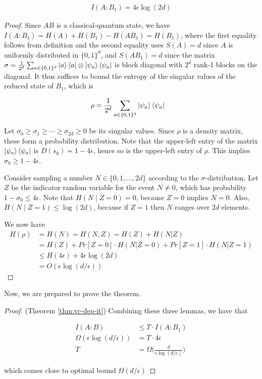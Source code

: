 \documentclass[main.tex]{subfiles}
\begin{document}
\begin{lemma}
\begin{align*}
I(A:B_1) = 4 \epsilon \log(2d)
\end{align*}

\begin{proof}
Since $AB$ is a classical-quantum state, we have $I(A : B_1) = H(A) + H(B_1) − H(AB_1) = H(B_1)$,
where the first equality follows from definition and the second equality uses $S(A) = d$ since
$A$ is uniformly distributed in $\{0,1\}^d$, and $S(AB_1) = d$ since the matrix $\sigma = \frac{1}{2^d} \sum_{a \in \{0,1\}^d} \ket{a}\bra{a} \otimes \ket{\psi_a} \bra{\psi_a}$ is block diagonal with $2^d$ rank-1 blocks on the diagonal. It thus suffices to bound the entropy of the singular values of the reduced state of $B_1$, which is

\begin{align*}
\rho &= \frac{1}{2^d} \sum_{a \in \{0, 1\}^d} \ket{\psi_a} \bra{\psi_a}	
\end{align*}

Let $\sigma_0 \geq \sigma_1 \geq \cdots \geq \sigma_{2d} \geq 0$ be its singular values. Since $\rho$ is a density matrix, these form a probability distribution. Note that the upper-left entry of the matrix $\ket{\psi_a}\bra{\psi_a}$ is $D(s_0) = 1-4\epsilon$, hence so is the upper-left entry of $\rho$. This implies $\sigma_0 \geq 1 − 4\epsilon$. 

Consider sampling a number $N \in \{0,1,...,2d\}$ according to the $\sigma$-distribution. Let $Z$ be the indicator random variable for the event $N \neq 0$, which has probability $1 - \sigma_0 \leq 4 \epsilon$. Note that $H(N\mid Z=0)=0$, because $Z=0$ implies $N = 0$. Also, $H(N \mid Z = 1) \leq \log(2d)$, because if $Z = 1$ then $N$ ranges over $2d$ elements. 

We now have
\begin{align*}
H(\rho) &= H(N) = H(N,Z) = H(Z) + H(N | Z)\\
&= H(Z) + Pr[Z = 0] \cdot H(N | Z = 0) + Pr[Z = 1] \cdot H(N | Z = 1) \\
&\leq H(4\epsilon)+4\epsilon \log(2d)\\
&= O(\epsilon \log(d/\epsilon)) \tag{Using the Taylor series of the logarithm}
\end{align*}
\end{proof}
\end{lemma}

Now, we are prepared to prove the theorem.

\begin{proof}(Theorem \ref{thm:vc-dep-it})
Combining these three lemmas, we have that 

\begin{align*}
I(A:B) &\leq T \cdot I(A:B_1) \\
\Omega(\epsilon \log(d/\epsilon)) &= T \cdot 4 \epsilon \\
T &= \Omega \Big(\frac{d}{\epsilon \log(d/\epsilon)}\Big)
\end{align*}

which comes close to optimal bound $\Omega (d / \epsilon)$
\end{proof}
\end{document}
